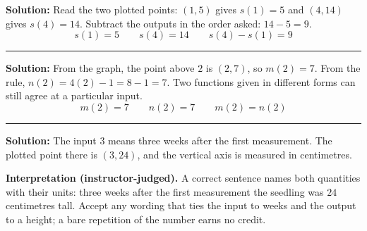 \documentclass[12pt]{article}
\begin{document}
\textbf{Solution:} \quad Read the two plotted points: $(1, 5)$ gives $s(1) = 5$ and $(4, 14)$
gives $s(4) = 14$. Subtract the outputs in the order asked: $14 - 5 = 9$.
\[ \boxed{s(1) = 5 \qquad s(4) = 14 \qquad s(4) - s(1) = 9} \]

\vspace{0.25cm}

\noindent\rule{\linewidth}{0.2pt}


\textbf{Solution:} \quad From the graph, the point above $2$ is $(2, 7)$, so $m(2) = 7$. From the
rule, $n(2) = 4(2) - 1 = 8 - 1 = 7$. Two functions given in different forms can still agree at a
particular input.
\[ \boxed{m(2) = 7 \qquad n(2) = 7 \qquad m(2) = n(2)} \]

\vspace{0.25cm}

\noindent\rule{\linewidth}{0.2pt}


\textbf{Solution:} \quad The input $3$ means three weeks after the first measurement. The plotted
point there is $(3, 24)$, and the vertical axis is measured in centimetres.

\textbf{Interpretation (instructor-judged).} A correct sentence names both quantities with their
units: three weeks after the first measurement the seedling was $24$ centimetres tall. Accept
any wording that ties the input to weeks and the output to a height; a bare repetition of the
number earns no credit.
\end{document}
